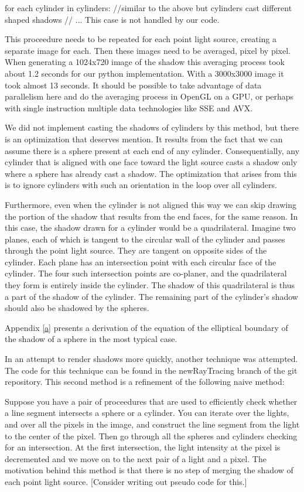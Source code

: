 \documentclass[letter,10pt]{article}
\begin{document}
for each cylinder in cylinders:
	//similar to the above but cylinders cast different shaped shadows
	// ...
	This case is not handled by our code.

This proceedure needs to be repeated for each point light source, creating a separate image for each. Then these images need to be averaged, pixel by pixel. When generating a 1024x720 image of the shadow this averaging process took about 1.2 seconds for our python implementation. With a 3000x3000 image it took almost 13 seconds. It should be possible to take advantage of data parallelism here and do the averaging process in OpenGL on a GPU, or perhaps with single instruction multiple data technologies like SSE and AVX.

We did not implement casting the shadows of cylinders by this method, but there is an optimization that deserves mention. It results from the fact that we can assume there is a sphere present at each end of any cylinder. Consequentially, any cylinder that is aligned with one face toward the light source casts a shadow only where a sphere has already cast a shadow. The optimization that arises from this is to ignore cylinders with such an orientation in the loop over all cylinders.

Furthermore, even when the cylinder is not aligned this way we can skip drawing the portion of the shadow that results from the end faces, for the same reason. In this case, the shadow drawn for a cylinder would be a quadrilateral. Imagine two planes, each of which is tangent to the circular wall of the cylinder and passes through the point light source. They are tangent on opposite sides of the cylinder. Each plane has an intersection point with each circular face of the cylinder. The four such intersection points are co-planer, and the quadrilateral they form is entirely inside the cylinder. The shadow of this quadrilateral is thus a part of the shadow of the cylinder. The remaining part of the cylinder's shadow should also be shadowed by the spheres.

Appendix \ref{a} presents a derivation of the equation of the elliptical boundary of the shadow of a sphere in the most typical case.

In an attempt to render shadows more quickly, another technique was attempted. The code for this technique can be found in the newRayTracing branch of the git repository. This second method is a refinement of the following naive method:

Suppose you have a pair of proceedures that are used to efficiently check whether a line segment intersects a sphere or a cylinder. You can iterate over the lights, and over all the pixels in the image, and construct the line segment from the light to the center of the pixel. Then go through all the spheres and cylinders checking for an intersection. At the first intersection, the light intensity at the pixel is decremented and we move on to the next pair of a light and a pixel. The motivation behind this method is that there is no step of merging the shadow of each point light source. [Consider writing out pseudo code for this.]
\end{document}
